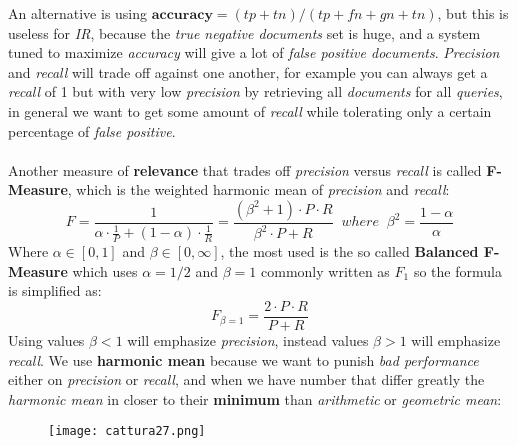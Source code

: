 \documentclass{article}
\begin{document}
An alternative is using $\mathbf{accuracy} = (tp + tn)/(tp + fn+ gn + tn)$, but this is useless for \emph{IR}, because the \emph{true negative documents} set is huge, and a system tuned to maximize \emph{accuracy} will give a lot of \emph{false positive documents}. \emph{Precision} and \emph{recall} will trade off against one another, for example you can always get a \emph{recall} of 1 but with very low \emph{precision} by retrieving all \emph{documents} for all \emph{queries}, in general we want to get some amount of \emph{recall} while tolerating only a certain percentage of \emph{false positive}. \\\\
Another measure of \textbf{relevance} that trades off \emph{precision} versus \emph{recall} is called \textbf{F-Measure}, which is the weighted harmonic mean of \emph{precision} and \emph{recall}:
\[ F = \frac{1}{\alpha \cdot \frac{1}{P} + (1-\alpha) \cdot \frac{1}{R}} = \frac{(\beta^2 + 1) \cdot P \cdot R}{\beta^2 \cdot P + R}\;\; where\;\; \beta^2 = \frac{1- \alpha}{\alpha}\]
Where $\alpha \in \left [0,1\right]$ and $\beta \in \left[0,\infty \right]$, the most used is the so called \textbf{Balanced F-Measure} which uses $\alpha = 1/2$ and $\beta = 1$ commonly written as $F_1$ so the formula is simplified as:
\[ F_{\beta = 1} = \frac{2 \cdot P \cdot R}{P + R}\]
Using values $\beta < 1$ will emphasize \emph{precision}, instead values $\beta > 1$ will emphasize \emph{recall}. We use \textbf{harmonic mean} because we want to punish \emph{bad performance} either on \emph{precision} or \emph{recall}, and when we have number that differ greatly the \emph{harmonic mean} in closer to their \textbf{minimum} than \emph{arithmetic} or \emph{geometric mean}:
\begin{figure}[H]
  \centering
  \texttt{[image: cattura27.png]}
\end{figure}
\end{document}
